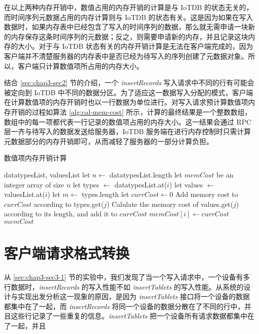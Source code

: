 在以上两种内存开销中，数值占用的内存开销的计算是与 IoTDB 的状态无关的，而时间序列元数据占用的内存计算则与 IoTDB 的状态有关。这是因为如果在写入数据时，如果内存表中已经包含了写入的时间序列的数据，那么就无需申请一块新的内存保存这条时间序列的元数据；反之，则需要申请新的内存，并且记录这块内存的大小。对于与 IoTDB 状态有关的内存开销计算是无法在客户端完成的，因为客户端并不清楚服务器的内存表中是否已经为待写入的序列创建了元数据对象。所以，客户端只计算数值项所占用的内存大小。

结合 \ref{sec:chap3-sec2} 节的介绍，一个 \emph{insertRecords} 写入请求中不同的行有可能会被定向到 IoTDB 中不同的数据分区。为了适应这一数据写入分配的模式，客户端在计算数值项的内存开销时也以一行数据为单位进行。对写入请求预计算数值项内存开销的过程如算法 \ref{alg:cal-mem-cost} 所示，计算的最终结果是一个整数数组，数组中的每一项都代表一行记录的数值项占用的内存大小。这一结果会通过 RPC 层一齐与待写入的数据发送给服务器，IoTDB 服务端在进行内存控制时只需计算元数据部分的内存开销即可，从而减轻了服务器的一部分计算负担。

\begin{algorithm}
  \caption{数值项内存开销计算}
  \label{alg:cal-mem-cost}
  \small
  \begin{algorithmic}
    \REQUIRE datatypesList, valuesList
    \STATE let $n \leftarrow$ datatypesList.length
    \STATE let $memCost$ be an integer array of size $n$
      \STATE let types $\leftarrow$ datatypesList.at($i$)
      \STATE let values $\leftarrow$ valuesList.at($i$)
      \STATE let $m \leftarrow$ types.length
      \STATE let $currCost \leftarrow 0$
        \STATE Add memory cost to $currCost$ according to types.get($j$)
          \STATE Calulate the memory cost of values.get($j$) according to its length, and add it to $currCost$
        \ENDIF
      \ENDFOR
      \STATE $memCost[i] \leftarrow currCost$
    \ENDFOR
    \RETURN $memCost$
  \end{algorithmic}
\end{algorithm}

\section{客户端请求格式转换}
从 \ref{sec:chap3-sec3-1} 节的实验中，我们发现了当一个写入请求中，一个设备有多行数据时，\emph{insertRecords} 的写入性能不如 \emph{insertTablets} 的写入性能。从系统的设计与实现出发分析这一现象的原因，是因为 \emph{insertTablets} 接口将一个设备的数据都集中在了一起，而 \emph{insertRecords} 将同一个设备的数据分散在了不同的行中，并且这些行记录了一些重复的信息。\emph{insertTablets} 把一个设备所有请求数据都集中在了一起，并且

